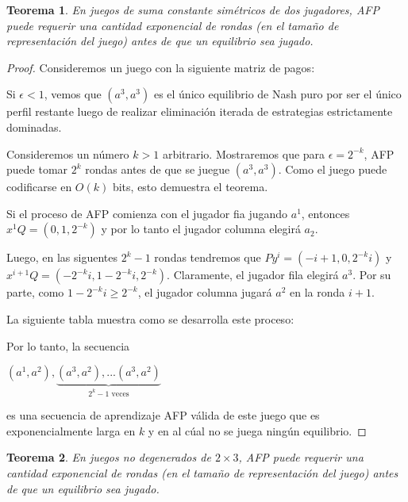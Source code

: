 \documentclass{article}
\newtheorem{theorem}{Teorema}
\begin{document}
\begin{theorem}
    En juegos de suma constante simétricos de dos jugadores, AFP puede requerir una cantidad exponencial de rondas
    (en el tamaño de representación del juego) antes de que un equilibrio sea jugado.
\end{theorem}

\begin{proof}
    Consideremos un juego con la siguiente matriz de pagos:

    

    Si $\epsilon < 1$, vemos que $(a^3, a^3)$ es el único equilibrio de Nash puro
    por ser el único perfil restante luego de realizar eliminación iterada de estrategias estrictamente dominadas.

    Consideremos un número $k > 1$ arbitrario. Mostraremos que para $\epsilon = 2^{-k}$, AFP puede tomar $2^k$ rondas antes de que
    se juegue $(a^3, a^3)$. Como el juego puede codificarse en $O(k)$ bits, esto demuestra el teorema.

    Si el proceso de AFP comienza con el jugador fia jugando $a^1$, entonces $x^1Q = (0, 1, 2^{-k})$ y por lo tanto
    el jugador columna elegirá $a_2$.

    Luego, en las siguentes $2^k - 1$ rondas tendremos que $Py^i = (-i + 1, 0, 2^{-k}i)$ y $x^{i+1}Q = (-2^{-k}i, 1 - 2^{-k}i, 2^{-k})$.
    Claramente, el jugador fila elegirá $a^3$.
    Por su parte, como $1 - 2^{-k}i \ge 2^{-k}$, el jugador columna jugará $a^2$ en la ronda $i + 1$.

    La siguiente tabla muestra como se desarrolla este proceso:

    

    Por lo tanto, la secuencia

    \begin{center}
    \begin{math}
        (a^1, a^2), \underbrace{(a^3, a^2), ... (a^3, a^2)}_{\text{$2^k - 1$ veces}}
    \end{math}
    \end{center}

    es una secuencia de aprendizaje AFP válida de este juego que es exponencialmente larga en $k$ y en al cúal no se juega ningún equilibrio.
\end{proof}

\begin{theorem}
    En juegos no degenerados de $2 \times 3$, AFP puede requerir una cantidad exponencial de rondas
    (en el tamaño de representación del juego) antes de que un equilibrio sea jugado.
\end{theorem}
\end{document}
